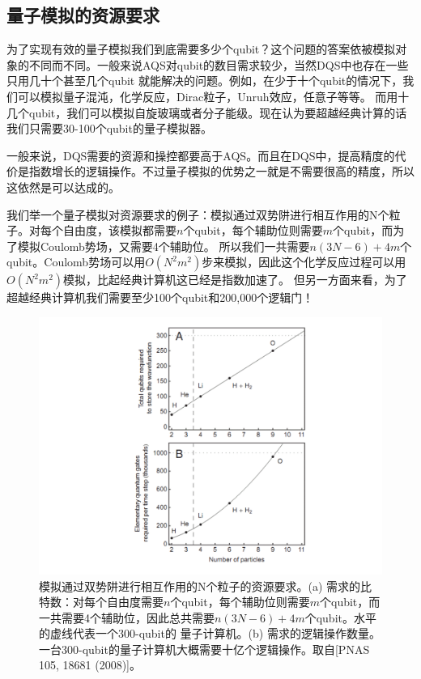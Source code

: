 \subsection{量子模拟的资源要求}

为了实现有效的量子模拟我们到底需要多少个qubit？这个问题的答案依被模拟对象的不同而不同。一般来说AQS对qubit的数目需求较少，当然DQS中也存在一些只用几十个甚至几个qubit
就能解决的问题。例如，在少于十个qubit的情况下，我们可以模拟量子混沌\cite{chaos1,chaos2}，化学反应\cite{reaction}，Dirac粒子\cite{dirac1,dirac2,dirac}，Unruh效应\cite{unruh}，任意子\cite{anyons1,anyons2}等等。
而用十几个qubit，我们可以模拟自旋玻璃\cite{glass1,glass2}或者分子能级\cite{Alan_first}。现在认为要超越经典计算的话我们只需要30-100个qubit的量子模拟器\cite{Alan_first}。

一般来说，DQS需要的资源和操控都要高于AQS。而且在DQS中，提高精度的代价是指数增长的逻辑操作\cite{tro1}。不过量子模拟的优势之一就是不需要很高的精度，所以这依然是可以达成的。

我们举一个量子模拟对资源要求的例子：模拟通过双势阱进行相互作用的N个粒子\cite{Polynomial_time_algorithm}。对每个自由度，该模拟都需要$n$个qubit，每个辅助位则需要$m$个qubit，而为了模拟Coulomb势场，又需要4个辅助位。
所以我们一共需要$n(3N-6)+4m$个qubit。Coulomb势场可以用$O(N^2m^2)$步来模拟，因此这个化学反应过程可以用$O(N^2m^2)$模拟，比起经典计算机这已经是指数加速了。
但另一方面来看，为了超越经典计算机我们需要至少100个qubit和200,000个逻辑门！

        \begin{figure}[htbp]
            \begin{center}
              \includegraphics[width= 0.8\columnwidth]{figures/resource.pdf}
              \caption{模拟通过双势阱进行相互作用的N个粒子的资源要求。(a) 需求的比特数：对每个自由度需要$n$个qubit，每个辅助位则需要$m$个qubit，而一共需要4个辅助位，因此总共需要$n(3N-6)+4m$个qubit。水平的虚线代表一个300-qubit的
              量子计算机。(b) 需求的逻辑操作数量。一台300-qubit的量子计算机大概需要十亿个逻辑操作。取自[PNAS 105, 18681  (2008)\cite{Polynomial_time_algorithm}]。
              }
              \label{resource}
            \end{center}
        \end{figure}

